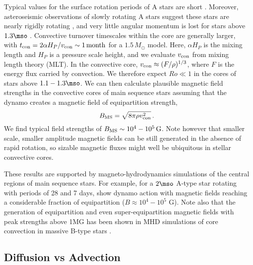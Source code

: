 Typical values for the surface rotation periods of A stars are short \citep[about 1 day, see e.g.]{Zorec_2012}. 
Moreover, asteroseismic observations of slowly rotating A stars suggest these stars are nearly rigidly rotating \cite{Kurtz_2014}, and very little angular momentum is lost for stars above $1.3\mso$ \citep[Kraft break, see e.g.][]{1967ApJ...150..551K,2013ApJ...776...67V}. 
Convective turnover timescales within the core are generally larger, with $t_{\rm con} = 2 \alpha H_P/v_{\rm con} \sim 1 \, {\rm month}$ for a $1.5 \, M_\odot$ model. Here, $\alpha H_P$ is the mixing length and $H_P$ is a pressure scale height, and we evaluate $v_{\rm con}$ from mixing length theory (MLT). In the convective core, $v_{\rm con} \approx (F/\rho)^{1/3}$, where $F$ is the energy flux carried by convection.
We therefore expect $Ro \ll 1$ in the cores of stars above $1.1-1.3\mso$. 
We can then calculate plausible magnetic field strengths in the convective cores of main sequence stars assuming that the dynamo creates a magnetic field of equipartition strength,
\begin{equation}
\label{eqn:Beq}
B_{\rm MS} = \sqrt{ 8 \pi \rho v_{\rm con}^2} \, .
\end{equation}
We find typical field strengths of $B_{\rm MS} \sim 10^4 - 10^5 \, {\rm G}$. Note however that smaller scale, smaller amplitude magnetic fields can be still generated in the absence of rapid rotation, so sizable magnetic fluxes might well be ubiquitous in stellar convective cores. 

These results are supported by magneto-hydrodynamics simulations of the central regions of main sequence stars. For example, for a $2\mso$ A-type star rotating with periods of 28 and 7 days, \citet{Brun_2005}
show dynamo action with magnetic fields reaching a considerable fraction of equipartition ($B \approx 10^4-10^5$ G). 
Note also that the generation of equipartition and even super-equipartition magnetic fields with peak strengths above 1MG has been shown in MHD simulations of core convection in massive B-type stars \cite{2013PhDT.......388A}.




\subsection{Diffusion vs Advection}
\label{time}

